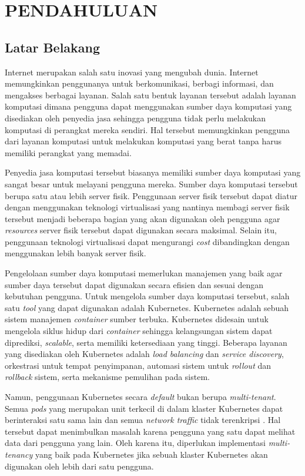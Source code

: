 \chapter{PENDAHULUAN}

\section{Latar Belakang}

Internet merupakan salah satu inovasi yang mengubah dunia. Internet
memungkinkan penggunanya untuk berkomunikasi, berbagi informasi, dan
mengakses berbagai layanan. Salah satu bentuk layanan tersebut adalah
layanan komputasi dimana pengguna dapat menggunakan sumber daya komputasi
yang disediakan oleh penyedia jasa sehingga pengguna tidak perlu melakukan
komputasi di perangkat mereka sendiri. Hal tersebut memungkinkan pengguna dari
layanan komputasi untuk melakukan komputasi yang berat tanpa harus memiliki
perangkat yang memadai.

Penyedia jasa komputasi tersebut biasanya memiliki sumber daya komputasi
yang sangat besar untuk melayani pengguna mereka. Sumber daya komputasi
tersebut berupa satu atau lebih server fisik. Penggunaan server
fisik tersebut dapat diatur dengan menggunakan teknologi virtualisasi
yang nantinya membagi server fisik tersebut menjadi beberapa bagian
yang akan digunakan oleh pengguna agar \emph{resources} server fisik tersebut
dapat digunakan secara maksimal. Selain itu, penggunaan teknologi virtualisasi dapat
mengurangi \emph{cost} dibandingkan dengan menggunakan lebih banyak server fisik.

Pengelolaan sumber daya komputasi memerlukan manajemen yang baik agar sumber
daya tersebut dapat digunakan secara efisien dan sesuai dengan kebutuhan
pengguna. Untuk mengelola sumber daya komputasi tersebut, salah satu
\emph{tool} yang dapat digunakan adalah Kubernetes. Kubernetes
adalah sebuah sistem manajemen \emph{container} sumber terbuka. Kubernetes
didesain untuk mengelola siklus hidup dari \emph{container} sehingga kelangsungan
sistem dapat diprediksi, \emph{scalable}, serta memiliki ketersediaan yang tinggi.
Beberapa layanan yang disediakan oleh Kubernetes adalah \emph{load balancing} dan
\emph{service discovery}, orkestrasi untuk tempat penyimpanan, automasi sistem
untuk \emph{rollout} dan \emph{rollback} sistem, serta mekanisme pemulihan
pada sistem.

Namun, penggunaan Kubernetes secara \emph{default} bukan berupa \emph{multi-tenant}.
Semua \emph{pods} yang merupakan unit terkecil di dalam klaster Kubernetes dapat
berinteraksi satu sama lain dan semua \emph{network traffic} tidak terenkripsi \parencite{kubernetes-website-multi-tenancy}.
Hal tersebut dapat menimbulkan masalah karena pengguna yang satu dapat
melihat data dari pengguna yang lain. Oleh karena itu, diperlukan
implementasi \emph{multi-tenancy} yang baik pada Kubernetes jika
sebuah klaster Kubernetes akan digunakan oleh lebih dari satu pengguna.

